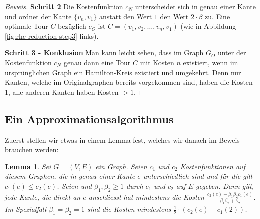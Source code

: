 \documentclass[a4paper,11pt]{scrreprt}
\begin{document}
\begin{proof}[Beweis]
\textbf{Schritt 2} Die Kostenfunktion $c_N$ unterscheidet sich in genau einer Kante und ordnet der Kante $\{v_n, v_1\}$ anstatt den Wert $1$ den Wert $2 \cdot \beta$ zu. Eine optimale Tour $\overline{C}$ bezüglich $c_O$ ist $\overline{C} = (v_1, v_2, \dots, v_n, v_1)$ (wie in Abbildung \ref{fig:rhc-reduction-step3} links).

\textbf{Schritt 3 - Konklusion} Man kann leicht sehen, dass im Graph $G_O$ unter der Kostenfunktion $c_N$ genau dann eine Tour $C$ mit Kosten $n$ existiert, wenn im ursprünglichen Graph ein Hamilton-Kreis existiert und umgekehrt. Denn nur Kanten, welche im Originalgraphen bereits vorgekommen sind, haben die Kosten 1, alle anderen Kanten haben Kosten $> 1$. 
\end{proof}

\subsection{Ein Approximationsalgorithmus}

Zuerst stellen wir etwas in einem Lemma fest, welches wir danach im Beweis brauchen werden:

\newtheorem{lemma1}{Lemma}

\begin{lemma1}
Sei $G = (V, E)$ ein Graph. Seien $c_1$ und $c_2$ Kostenfunktionen auf diesem Graphen, die in genau einer Kante $e$ unterschiedlich sind und für die gilt $c_1(e) \le c_2(e)$. Seien und $\beta_1, \beta_2 \ge 1$ durch $c_1$ und $c_2$ auf $E$ gegeben. Dann gilt, jede Kante, die direkt an $e$ anschliesst hat mindestens die Kosten $\frac{c_2(e) - \beta_1\beta_2 c_1(e)}{\beta_1\beta_2 + \beta_2}$. Im Spezialfall $\beta_1 = \beta_2 = 1$ sind die Kosten mindestens $\frac{1}{2} \cdot (c_2(e) - c_1(2))$.
\label{lemma:1}
\end{lemma1}
\end{document}
